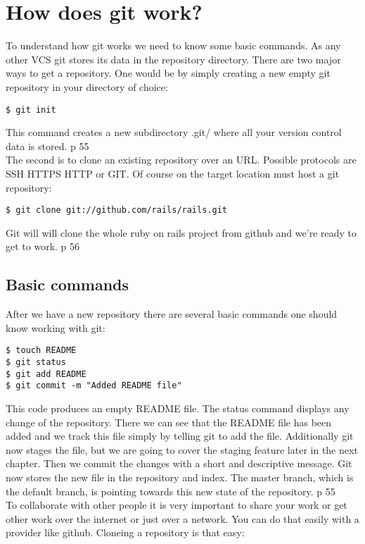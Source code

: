 \section{How does git work?}

To understand how git works we need to know some basic commands.
As any other VCS git stores its data in the repository directory.
There are two major ways to get a repository.
One would be by simply creating a new empty git repository in your directory of choice:
\begin{lstlisting}
$ git init
\end{lstlisting}
This command creates a new subdirectory .git/ where all your version control
data is stored. \cite{gitinternals2008} p 55 \\
The second is to clone an existing repository over an URL. Possible protocols
are SSH HTTPS HTTP or GIT. Of course on the target location must host a git
repository:
\begin{lstlisting}
$ git clone git://github.com/rails/rails.git
\end{lstlisting}
Git will will clone the whole ruby on rails project from github and we're
ready to get to work. \cite{gitinternals2008} p 56

\subsection {Basic commands}

After we have a new repository there are several basic commands one should know
working with git:
\begin{lstlisting}
$ touch README
$ git status
$ git add README
$ git commit -m "Added README file"
\end{lstlisting}

This code produces an empty README file. The status command displays any change
of the repository. There we can see that the README file has been added and we
track this file simply by telling git to add the file. Additionally git now
stages the file, but we are going to cover the staging feature later in the next
chapter. Then we commit the changes with a short and descriptive message. Git
now stores the new file in the repository and index. The master branch, 
which is the default branch, is pointing towards this new state of the repository. \cite{gitinternals2008} p 55 \\




To collaborate with other people it is very important to share your work or get
other work over the internet or just over a network. You can do that easily with
a provider like github. Cloneing a repository is that easy:



